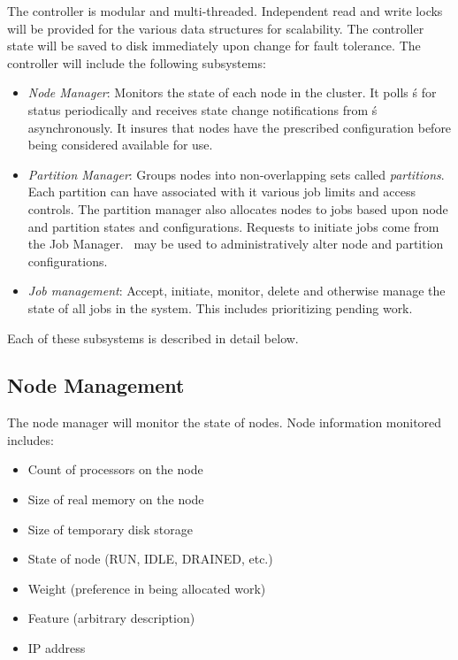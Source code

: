 The controller is modular and multi-threaded.  Independent read
and write locks will be provided for the various data structures for
scalability.  The controller state will be saved to disk immediately
upon change for fault tolerance.  The controller  will include the
following subsystems:

\begin{itemize}
\item {\em Node Manager}: Monitors the state of each node in
the cluster.  It polls \slurmd\'s for status periodically and
receives state change notifications from \slurmd\'s asynchronously.
It insures that nodes have the prescribed configuration before being 
considered available for use.

\item {\em Partition Manager}: Groups nodes into non-overlapping sets called
{\em partitions}. Each partition can have associated with it various job
limits and access controls.  The partition manager also allocates nodes
to jobs based upon node and partition states and configurations. Requests
to initiate jobs come from the Job Manager.  \scontrol\ may be used
to administratively alter node and partition configurations.

\item {\em Job management}: Accept, initiate, monitor, delete and
otherwise manage the state of all jobs in the system. This includes
prioritizing pending work.


\end{itemize}

Each of these subsystems is described in detail below.

\subsection{Node Management}

The node manager will monitor the state of nodes.  Node information
monitored includes:

\begin{itemize}
\item Count of processors on the node
\item Size of real memory on the node
\item Size of temporary disk storage
\item State of node (RUN, IDLE, DRAINED, etc.)
\item Weight (preference in being allocated work)
\item Feature (arbitrary description)
\item IP address
\end{itemize}

